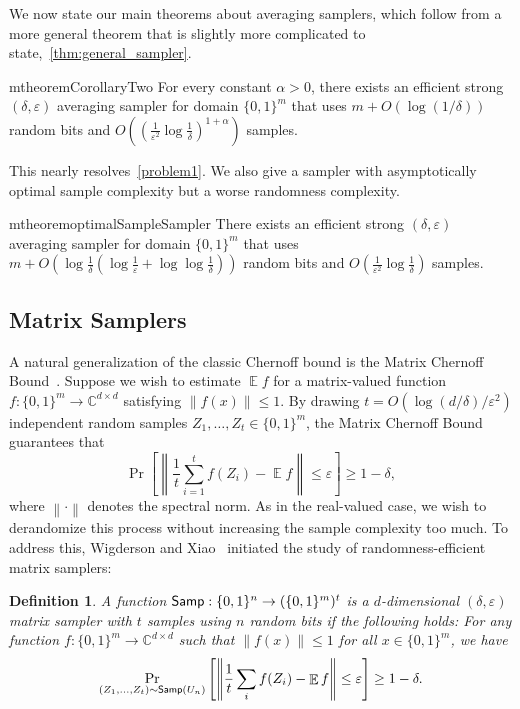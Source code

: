 \documentclass[10pt,a4paper]{article}
\newtheorem{definition}[theorem]{Definition}
\newcommand{\C}{\mathbb{C}}
\DeclareMathOperator*{\E}{\mathbb{E}}
\newcommand{\eps}{\varepsilon}
\newcommand{\1}{\mathbbm{1}}
\newcommand{\norm}[1]{\left\lVert #1\right\rVert}
\newcommand{\zo}{\{0, 1\}}
\newcommand{\Smp}{\textup{\textsf{Samp}}}
\newcommand{\Prb}[2][]{\Pr_{#1}\left[#2\right]}
\begin{document}
We now state our main theorems about averaging samplers, which follow from a more general theorem that is slightly more complicated to state,~\cref{thm:general_sampler}.


\begin{restatable}{mtheorem}{CorollaryTwo}
    \label{cor:domain_sampler}
     For every constant $\alpha > 0$, there exists an efficient strong $(\delta, \eps)$ averaging sampler for domain $\zo^m$ that uses  $m + O(\log(1/\delta))$ random bits and  $O((\frac{1}{\eps^{2}} \log \frac{1}{\delta})^{1 + \alpha})$ samples.
\end{restatable}


This nearly resolves~\cref{problem1}. We also give a sampler with asymptotically optimal sample complexity but a worse randomness complexity.


\begin{restatable}{mtheorem}{optimalSampleSampler}
    \label{lem:optimal_sample_sampler}
    There exists an efficient strong $(\delta, \eps)$ averaging sampler for domain $\zo^m$ that uses $m + O(\log\frac{1}{\delta} (\log \frac{1}{\eps} + \log\log\frac{1}{\delta} ))$ random bits and $O(\frac{1}{\eps^{2}} \log \frac{1}{\delta})$ samples. 
\end{restatable}


\subsection{Matrix Samplers}
A natural generalization of the classic Chernoff bound is the Matrix Chernoff Bound~\cite{Rud99, AW02, Tro12}. Suppose we wish to estimate $\E f$ for a matrix-valued function $f: \zo^m \to \C^{d \times d}$ satisfying $\norm{f(x)} \le 1$.
By drawing $t = O(\log(d/\delta)/\eps^2)$ independent random samples $Z_1, \dots, Z_t \in \zo^m$, the
Matrix Chernoff Bound guarantees that \[
    \Prb{\norm{\frac{1}{t} \sum_{i=1}^t f(Z_i) - \E f} \le \eps} \ge 1 - \delta,
\]
where $\norm{\cdot}$ denotes the spectral norm.
As in the real-valued case, we wish to derandomize this process without increasing the sample complexity too much. 
To address this, Wigderson and Xiao~\cite{WX05} initiated the study of randomness-efficient matrix samplers:
\begin{definition}
    A function $\Smp : \zo^n \to (\zo^m)^t$ is a $d$-dimensional $(\delta, \eps)$ matrix sampler with $t$ samples using $n$ random bits if the following holds: For any function $f : \zo^m \to \C^{d \times d}$ such that $\|f(x)\| \leq 1$ for all $x \in \zo^m$, we have
    \[
    \Pr_{(Z_1, \dots, Z_t) \sim \Smp(U_n)}
    \left[ \norm{\frac{1}{t}  \sum_i f(Z_i) - \E f} \leq \varepsilon \right]
    \geq 1 - \delta.
    \]
\end{definition}
\end{document}
